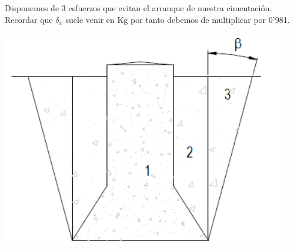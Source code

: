 \documentclass{article}
\begin{document}
            Disponemos de 3 esfuerzos que evitan el arranque de nuestra cimentación.
            \\
            
            Recordar que $\delta_{x}$ suele venir en Kg por tanto debemos de multiplicar por 0'981.
            
            \begin{center}
            \includegraphics[scale = 0.4]{assets/img/Patas Separadas/Esfuerzo a compresion.png}
            \end{center}
            
\end{document}
